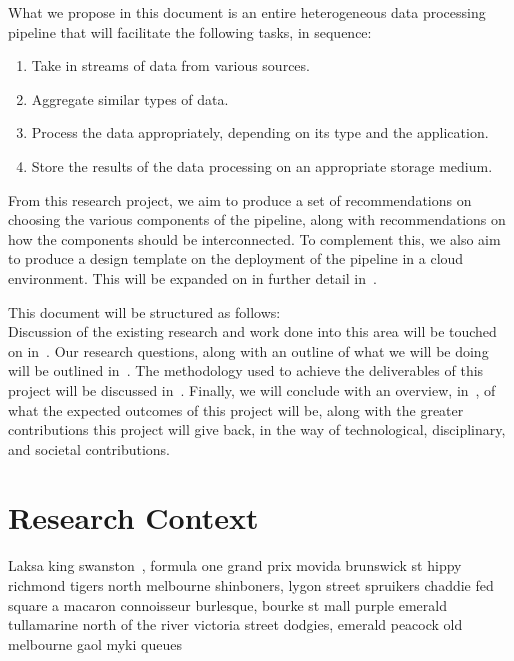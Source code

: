 \documentclass[a4paper,11pt]{article}
\begin{document}
What we propose in this document is an entire heterogeneous data processing pipeline that will facilitate the following
tasks, in sequence:

\begin{enumerate}
  \item Take in streams of data from various sources.
  \item Aggregate similar types of data.
  \item Process the data appropriately, depending on its type and the application.
  \item Store the results of the data processing on an appropriate storage medium.
\end{enumerate}

From this research project, we aim to produce a set of recommendations on choosing the various components of the
pipeline, along with recommendations on how the components should be interconnected. To complement this, we also aim to produce a design template on the
deployment of the pipeline in a cloud environment. This will be expanded on in further detail
in~.

This document will be structured as follows:\\ Discussion of the existing research and work done into this area will be
touched on in~. Our research questions, along with an outline of what we will be doing
will be outlined in~. The methodology used to achieve the deliverables of this project will be
discussed in~. Finally, we will conclude with an overview, in~,
of what the expected outcomes of this project will be, along with the greater contributions this project will give back,
in the way of technological, disciplinary, and societal contributions. %



\section{Research Context} %
\label{sec:research_context}
Laksa king swanston~\cite{toshniwal_stormtwitter_2014}, formula one grand prix movida brunswick st hippy richmond tigers north melbourne shinboners, lygon street spruikers chaddie fed square a macaron connoisseur burlesque, bourke st mall purple emerald tullamarine north of the river victoria street dodgies, emerald peacock old melbourne gaol myki queues
\end{document}
